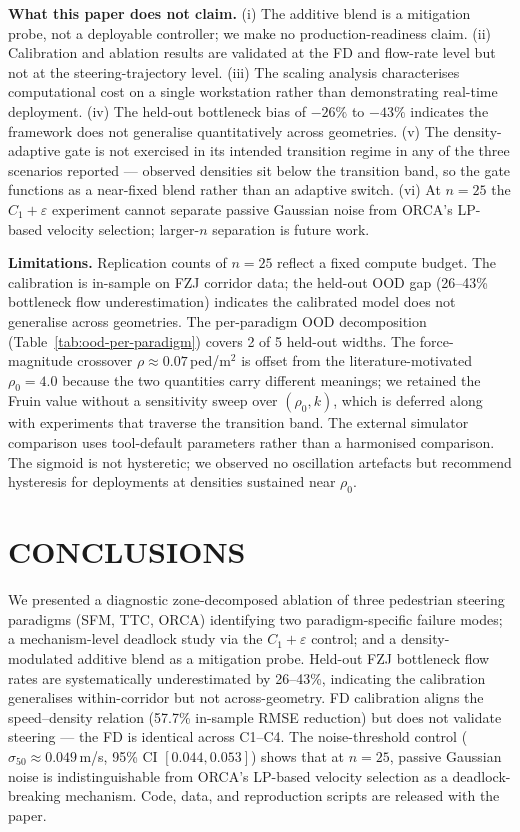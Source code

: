 \documentclass[a4paper,twoside]{article}
\begin{document}
\textbf{What this paper does not claim.}
(i) The additive blend is a mitigation probe, not a deployable controller; we make no production-readiness claim. (ii) Calibration and ablation results are validated at the FD and flow-rate level but not at the steering-trajectory level. (iii) The scaling analysis characterises computational cost on a single workstation rather than demonstrating real-time deployment. (iv) The held-out bottleneck bias of $-26\%$ to $-43\%$ indicates the framework does not generalise quantitatively across geometries. (v) The density-adaptive gate is not exercised in its intended transition regime in any of the three scenarios reported --- observed densities sit below the transition band, so the gate functions as a near-fixed blend rather than an adaptive switch. (vi) At $n=25$ the $C_1+\varepsilon$ experiment cannot separate passive Gaussian noise from ORCA's LP-based velocity selection; larger-$n$ separation is future work.

\textbf{Limitations.}
Replication counts of $n=25$ reflect a fixed compute budget. The calibration is in-sample on FZJ corridor data; the held-out OOD gap (26--43\% bottleneck flow underestimation) indicates the calibrated model does not generalise across geometries. The per-paradigm OOD decomposition (Table~\ref{tab:ood-per-paradigm}) covers 2 of 5 held-out widths. The force-magnitude crossover $\rho\approx 0.07$\,ped/m$^2$ is offset from the literature-motivated $\rho_0=4.0$ because the two quantities carry different meanings; we retained the Fruin value without a sensitivity sweep over $(\rho_0,k)$, which is deferred along with experiments that traverse the transition band. The external simulator comparison uses tool-default parameters rather than a harmonised comparison. The sigmoid is not hysteretic; we observed no oscillation artefacts but recommend hysteresis for deployments at densities sustained near $\rho_0$.


\section{\uppercase{Conclusions}}
\label{sec:conclusion}

We presented a diagnostic zone-decomposed ablation of three pedestrian steering paradigms (SFM, TTC, ORCA) identifying two paradigm-specific failure modes; a mechanism-level deadlock study via the $C_1+\varepsilon$ control; and a density-modulated additive blend as a mitigation probe. Held-out FZJ bottleneck flow rates are systematically underestimated by 26--43\%, indicating the calibration generalises within-corridor but not across-geometry. FD calibration aligns the speed--density relation (57.7\% in-sample RMSE reduction) but does not validate steering --- the FD is identical across C1--C4. The noise-threshold control ($\sigma_{50}\approx 0.049$\,m/s, 95\% CI $[0.044,0.053]$) shows that at $n=25$, passive Gaussian noise is indistinguishable from ORCA's LP-based velocity selection as a deadlock-breaking mechanism. Code, data, and reproduction scripts are released with the paper.
\end{document}
